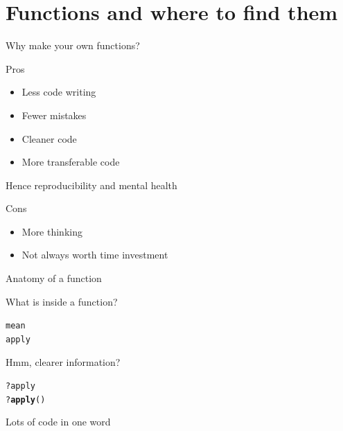 \documentclass{beamer}\usepackage[]{graphicx}\usepackage[]{color}
\makeatletter
\newcommand{\hlopt}[1]{\textcolor[rgb]{0,0,0}{#1}}%
\newcommand{\hlstd}[1]{\textcolor[rgb]{0.345,0.345,0.345}{#1}}%
\newcommand{\hlkwd}[1]{\textcolor[rgb]{0.737,0.353,0.396}{\textbf{#1}}}%
\newenvironment{kframe}{%
 \def\at@end@of@kframe{}%
 \ifinner\ifhmode%
  \def\at@end@of@kframe{\end{minipage}}%
  \begin{minipage}{\columnwidth}%
 \fi\fi%
 \def\FrameCommand##1{\hskip\@totalleftmargin \hskip-\fboxsep
 \colorbox{shadecolor}{##1}\hskip-\fboxsep
     \hskip-\linewidth \hskip-\@totalleftmargin \hskip\columnwidth}%
 \MakeFramed {\advance\hsize-\width
   \@totalleftmargin\z@ \linewidth\hsize
   \@setminipage}}%
 {\par\unskip\endMakeFramed%
 \at@end@of@kframe}
\newenvironment{knitrout}{}{} %
\makeatother
\begin{document}
\section{Functions and where to find them}

\begin{frame}{Why make your own functions?}
  
\begin{block}{Pros}
  \begin{itemize}
    \item Less code writing
    \item Fewer mistakes
    \item Cleaner code
    \item More transferable code
  \end{itemize}
  Hence reproducibility and mental health
\end{block}  

\pause

\begin{alertblock}{Cons}
  \begin{itemize}
    \item More thinking
    \item Not always worth time investment
  \end{itemize}
\end{alertblock}

\end{frame}


\begin{frame}[fragile]{Anatomy of a function}

What is inside a function?
\begin{knitrout}
\color{fgcolor}\begin{kframe}
\begin{alltt}
  \hlstd{mean}
  \hlstd{apply}
\end{alltt}
\end{kframe}
\end{knitrout}

\pause
Hmm, clearer information?
\begin{knitrout}
\color{fgcolor}\begin{kframe}
\begin{alltt}
  \hlopt{?}\hlstd{apply}
  \hlopt{?}\hlkwd{apply}\hlstd{()}
\end{alltt}
\end{kframe}
\end{knitrout}
\pause

\begin{block}{Lots of code in one word}
\end{block}
\end{frame}
\end{document}
